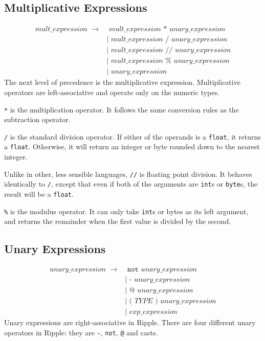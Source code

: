 \documentclass{article}
\newcommand{\code}{\texttt}
\begin{document}
\subsection{Multiplicative Expressions}
\begin{align*}
mult\_expression\,\,\rightarrow& \,\,mult\_expression\,\,\code{*}\,\,unary\_expression  \\
                    	       &|\,\,mult\_expression\,\,\code{/}\,\,unary\_expression  \\
                    	       &|\,\,mult\_expression\,\,\code{//}\,\,unary\_expression \\
                    	       &|\,\,mult\_expression\,\,\code{\%}\,\,unary\_expression \\
                    	       &|\,\,unary\_expression
\end{align*}
The next level of precedence is the multiplicative expression. Multiplicative operators are left-associative and operate only on the numeric types.

\code{*} is the multiplication operator. It follows the same conversion rules as the subtraction operator.

\code{/} is the standard division operator. If either of the operands is a \code{float}, it returns a \code{float}. Otherwise, it will return an integer or byte rounded down to the nearest integer.

Unlike in other, less sensible languages, \code{//} is floating point division. It behaves identically to \code{/}, except that even if both of the arguments are \code{int}s or \code{byte}s, the result will be a \code{float}.

\code{\%} is the modulus operator. It can only take \code{int}s or bytes as its left argument, and returns the remainder when the first value is divided by the second.

\subsection{Unary Expressions}
\begin{align*}
unary\_expression\,\,\rightarrow&  \,\,\code{not}\,\,unary\_expression                   \\
                                &| \,\,\code{-}\,\,unary\_expression                     \\
                                &| \,\,\code{@}\,\,unary\_expression                     \\
                                &| \,\,\code{(}\,\,TYPE\,\,\code{)}\,\,unary\_expression \\
                                &| \,\,exp\_expression
\end{align*}
Unary expressions are right-associative in Ripple. There are four different unary operators in Ripple: they are \code{-}, \code{not}, \code{@} and casts.
\end{document}
